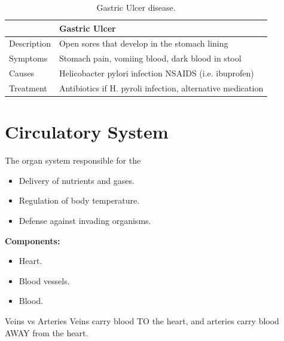 \documentclass[12pt]{report}
\begin{document}
\begin{table}[h!]
    \renewcommand{\arraystretch}{1.5}
    \setlength{\tabcolsep}{10pt}
    \setlength{\arrayrulewidth}{0.25mm}

    \begin{center}
        \vspace{0.5em}
    \begin{tabular}{|l|l|}
        \hline
         & Gastric Ulcer \\ 
        \hline
        Description & Open sores that develop in the stomach lining \\
        \hline
        Symptoms & Stomach pain, vomiing blood, dark blood in stool\\ 
        \hline 
        Causes & Helicobacter pylori infection NSAIDS (i.e. ibuprofen)\\ 
        \hline
        Treatment & Antibiotics if H. pyroli infection, alternative medication\\ 
        \hline
        \end{tabular}
    \end{center}
    \caption{Gastric Ulcer disease.}
\end{table}

\section{Circulatory System}
\begin{definition}
    The organ system responsible for the 
    \begin{itemize}
        \item{Delivery of nutrients and gases.}
        \item{Regulation of body temperature.}
        \item{Defense against invading organisms.}
    \end{itemize}
    \textbf{Components:}
    \begin{itemize}
        \item{Heart.}
        \item{Blood vessels.}
        \item{Blood.}
    \end{itemize}
\end{definition}

\begin{note}{Veins vs Arteries}
    Veins carry blood TO the heart, and arteries carry blood AWAY from the heart.
\end{note}
\end{document}
